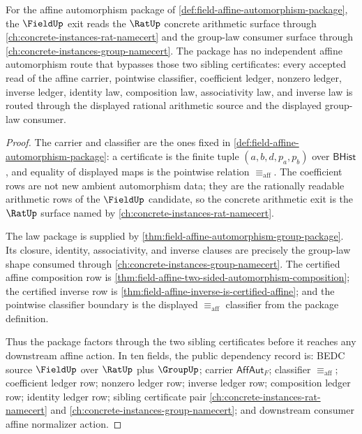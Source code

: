 \begin{theorem}
\label{thm:fieldup-rat-group-sibling-lattice-dependency}
For the affine automorphism package of
\autoref{def:field-affine-automorphism-package}, the $\FieldUp$ exit reads the
$\RatUp$ concrete arithmetic surface through
\autoref{ch:concrete-instances-rat-namecert} and the group-law consumer surface
through \autoref{ch:concrete-instances-group-namecert}. The package has no
independent affine automorphism route that bypasses those two sibling
certificates: every accepted read of the affine carrier, pointwise classifier,
coefficient ledger, nonzero ledger, inverse ledger, identity law, composition
law, associativity law, and inverse law is routed through the displayed
rational arithmetic source and the displayed group-law consumer.
\end{theorem}
\begin{proof}
The carrier and classifier are the ones fixed in
\autoref{def:field-affine-automorphism-package}: a certificate is the finite
tuple $(a,b,d,p_a,p_b)$ over $\mathsf{BHist}$, and equality of displayed maps is
the pointwise relation $\equiv_{\mathrm{aff}}$. The coefficient rows are not
new ambient automorphism data; they are the rationally readable arithmetic rows
of the $\FieldUp$ candidate, so the concrete arithmetic exit is the $\RatUp$
surface named by \autoref{ch:concrete-instances-rat-namecert}.

The law package is supplied by
\autoref{thm:field-affine-automorphism-group-package}. Its closure, identity,
associativity, and inverse clauses are precisely the group-law shape consumed
through \autoref{ch:concrete-instances-group-namecert}. The certified affine
composition row is
\autoref{thm:field-affine-two-sided-automorphism-composition}; the certified
inverse row is \autoref{thm:field-affine-inverse-is-certified-affine}; and the
pointwise classifier boundary is the displayed
$\equiv_{\mathrm{aff}}$ classifier from the package definition.

Thus the package factors through the two sibling certificates before it reaches
any downstream affine action. In ten fields, the public dependency record is:
BEDC source $\FieldUp$ over $\RatUp$ plus $\GroupUp$; carrier
$\mathsf{AffAut}_F$; classifier $\equiv_{\mathrm{aff}}$; coefficient ledger row;
nonzero ledger row; inverse ledger row; composition ledger row; identity ledger
row; sibling certificate pair \autoref{ch:concrete-instances-rat-namecert}
and \autoref{ch:concrete-instances-group-namecert};
and downstream consumer affine normalizer action.
\end{proof}

